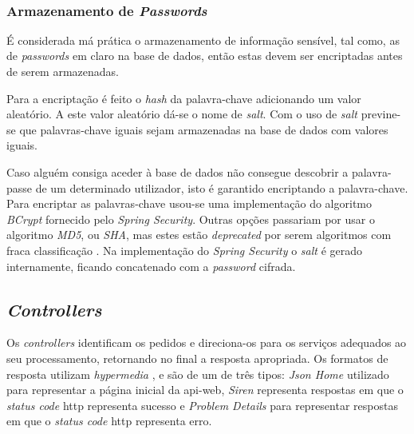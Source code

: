 \hspace{-1.25cm}
\\[0.25cm]


\subsubsection{Armazenamento de \textit{Passwords}}

É considerada má prática o armazenamento de informação sensível, tal como, as de \textit{passwords} em claro na base de dados, então estas devem ser encriptadas antes de serem armazenadas.

Para a encriptação é feito o \textit{hash} da palavra-chave adicionando um valor aleatório. A este valor aleatório dá-se o nome de \textit{salt}. Com o uso de \textit{salt} previne-se que palavras-chave iguais sejam armazenadas na base de dados com valores iguais. 

Caso alguém consiga aceder à base de dados não consegue descobrir a palavra-passe de um determinado utilizador, isto é garantido encriptando a palavra-chave. Para encriptar as palavras-chave usou-se uma implementação do algoritmo \textit{BCrypt} \cite{BCrypt:spring-security} fornecido pelo \textit{Spring Security}. Outras opções passariam por usar o algoritmo \textit{MD5}, ou \textit{SHA}, mas estes estão \textit{deprecated} por serem algoritmos com fraca classificação \cite{DeprecatedAlgorithms:online}. Na implementação do \textit{Spring Security} o \textit{salt} é gerado internamente, ficando concatenado com a \textit{password} cifrada.

%
%
\subsection{\textit{Controllers}}\label{subsec333}

Os \textit{controllers} identificam os pedidos e direciona-os para os serviços adequados ao seu processamento, retornando no final a resposta apropriada. Os formatos de resposta utilizam \textit{hypermedia} \cite{APIBestP87:hypermedia}, e são de um de três tipos: \textit{Json Home} \cite{draftnot72:jsonHome} utilizado para representar a página inicial da \gls{api-web}, \textit{Siren} \cite{kevinswiber:siren} representa respostas em que o \textit{status code} \acrshort{http} representa sucesso e \textit{Problem Details} \cite{RFC7807:problemDetails} para representar respostas em que o \textit{status code} \acrshort{http} representa erro.

